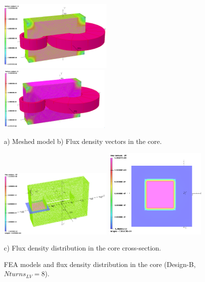 \documentclass[a4paper, 11pt]{article} %
\begin{document}
\begin{figure}[]
  \centering
    \includegraphics[width=0.5\textwidth]{N8_B}
    \includegraphics[width=0.49\textwidth]{N8_Bvectors}

a) Meshed model \hspace{1in} b) Flux density vectors in the core.

    \includegraphics[width=0.5\textwidth]{N8_core_By}
    \includegraphics[width=0.45\textwidth]{N8_core_By3}

c) Flux density distribution in the core cross-section.

  \caption{FEA models and flux density distribution in the core (Design-B, $Nturns_{LV}=8$).}
  \label{Np8_FEA}
\end{figure}

\clearpage
\end{document}
